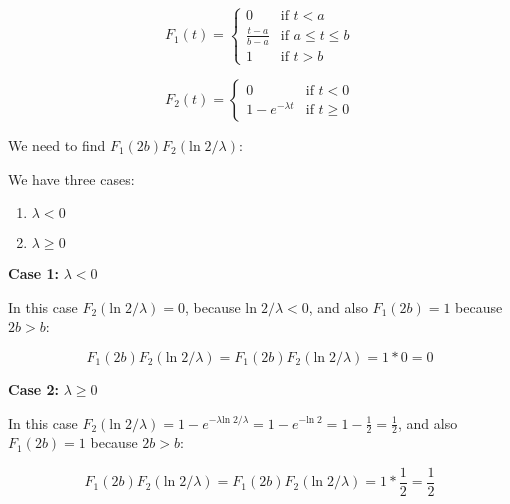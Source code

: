 \begin{equation}
    F_1(t) = \begin{cases}
        0                 & \text{if } t < a           \\
        \frac{t - a}{b-a} & \text{if } a \leq t \leq b \\
        1                 & \text{if } t > b
    \end{cases}
\end{equation}

\singlespacing

\begin{equation}
    F_2(t) = \begin{cases}
        0                  & \text{if } t < 0    \\
        1 - e^{-\lambda t} & \text{if } t \geq 0
    \end{cases}
\end{equation}

\singlespacing

We need to find $F_1(2b)F_2(\text{ln}\; 2/\lambda)$:

\singlespacing

We have three cases:

\singlespacing

\begin{enumerate}
    \item $\lambda < 0$
    \item $\lambda \geq 0$
\end{enumerate}

\singlespacing

\textbf{Case 1:} $\lambda < 0$

\singlespacing

In this case $F_2(\text{ln}\; 2/\lambda) = 0$, because $\text{ln}\; 2/\lambda < 0$,
and also $F_1(2b) = 1$ because $2b > b$:

\singlespacing

\begin{equation}
    F_1(2b)F_2(\text{ln}\; 2/\lambda) = F_1(2b)F_2(\text{ln}\; 2/\lambda) = 1 * 0 = 0
\end{equation}

\singlespacing

\textbf{Case 2:} $\lambda \geq 0$

\singlespacing

In this case $F_2(\text{ln}\; 2/\lambda) = 1 - e^{-\lambda \text{ln}\; 2/\lambda} = 1 - e^{-\text{ln}\; 2} = 1 - \frac{1}{2} = \frac{1}{2}$,
and also $F_1(2b) = 1$ because $2b > b$:

\singlespacing

\begin{equation}
    F_1(2b)F_2(\text{ln}\; 2/\lambda) = F_1(2b)F_2(\text{ln}\; 2/\lambda) = 1 * \frac{1}{2} = \frac{1}{2}
\end{equation}